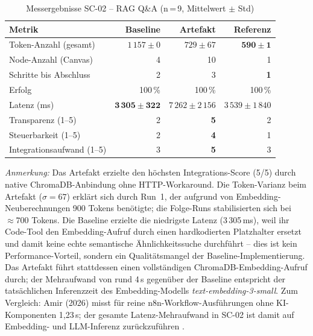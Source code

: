 \documentclass[12pt,a4paper,oneside]{report}
\begin{document}
\begin{table}[H]
  \centering
  \caption{Messergebnisse SC-02 -- RAG Q\&A (n\,=\,9, Mittelwert $\pm$ Std)}
  \label{tab:results-sc02}
  \begin{tabular}{lrrr}
    \toprule
    \textbf{Metrik} & \textbf{Baseline} & \textbf{Artefakt} & \textbf{Referenz} \\
    \midrule
    Token-Anzahl (gesamt)      & $1\,157 \pm 0$           & $729 \pm 67$              & $\mathbf{590 \pm 1}$ \\
    Node-Anzahl (Canvas)       & 4                        & 10                        & 1 \\
    Schritte bis Abschluss     & 2                        & 3                         & \textbf{1} \\
    Erfolg                     & 100\,\%                  & 100\,\%                   & 100\,\% \\
    Latenz (ms)                & $\mathbf{3\,305 \pm 322}$ & $7\,262 \pm 2\,156$      & $3\,539 \pm 1\,840$ \\
    Transparenz (1--5)         & 2                        & \textbf{5}                & 2 \\
    Steuerbarkeit (1--5)       & 2                        & \textbf{4}                & 1 \\
    Integrationsaufwand (1--5) & 3                        & \textbf{5}                & 3 \\
    \bottomrule
  \end{tabular}
\end{table}

\noindent\textit{Anmerkung:} Das Artefakt erzielte den höchsten Integrations-Score (5/5)
durch native ChromaDB-Anbindung ohne HTTP-Workaround. Die Token-Varianz beim Artefakt
($\sigma = 67$) erklärt sich durch Run~1, der aufgrund von Embedding-Neuberechnungen
900 Tokens benötigte; die Folge-Runs stabilisierten sich bei $\approx 700$ Tokens.
Die Baseline erzielte die niedrigste Latenz (3\,305\,ms), weil ihr Code-Tool den
Embedding-Aufruf durch einen hardkodierten Platzhalter ersetzt und damit keine echte
semantische Ähnlichkeitssuche durchführt -- dies ist kein Performance-Vorteil, sondern
ein Qualitätsmangel der Baseline-Implementierung. Das Artefakt führt stattdessen einen
vollständigen ChromaDB-Embedding-Aufruf durch; der Mehraufwand von rund 4\,s gegenüber
der Baseline entspricht der tatsächlichen Inferenzzeit des Embedding-Modells
\textit{text-embedding-3-small}. Zum Vergleich: Amir (2026) misst für reine
n8n-Workflow-Ausführungen ohne KI-Komponenten 1{,}23\,s; der gesamte Latenz-Mehraufwand
in SC-02 ist damit auf Embedding- und LLM-Inferenz zurückzuführen
\cite{amir2026evaluating}.
\end{document}

